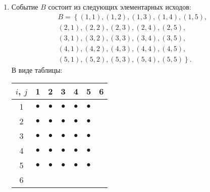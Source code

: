 \begin{enumerate}
    \item
    Событие $B$ состоит из следующих элементарных исходов:
    \begin{multline}
        B = \left \{ (1,1), (1,2), (1,3), (1,4), (1,5), \right . \\
        (2,1), (2,2), (2,3), (2,4), (2,5), \\
        (3,1), (3,2), (3,3), (3,4), (3,5), \\
        (4,1), (4,2), (4,3), (4,4), (4,5), \\
        \left . (5,1), (5,2), (5,3), (5,4), (5,5) \right \} .
    \end{multline}
    В виде таблицы:
    \begin{center}
        \begin{tabular}{c|c|c|c|c|c|c|}
            $i$, $j$ & 1         & 2         & 3         & 4         & 5         & 6 \\
            \hline
            1        & $\bullet$ & $\bullet$ & $\bullet$ & $\bullet$ & $\bullet$ &   \\
            \hline
            2        & $\bullet$ & $\bullet$ & $\bullet$ & $\bullet$ & $\bullet$ &   \\
            \hline
            3        & $\bullet$ & $\bullet$ & $\bullet$ & $\bullet$ & $\bullet$ &   \\
            \hline
            4        & $\bullet$ & $\bullet$ & $\bullet$ & $\bullet$ & $\bullet$ &   \\
            \hline
            5        & $\bullet$ & $\bullet$ & $\bullet$ & $\bullet$ & $\bullet$ &   \\
            \hline
            6        &           &           &           &           &           &   \\
            \hline
        \end{tabular}
    \end{center}


\end{enumerate}
